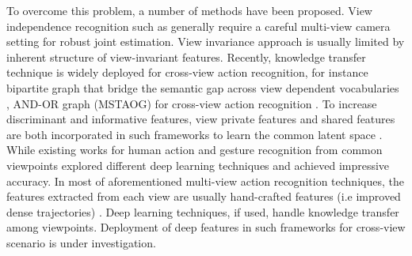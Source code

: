         To overcome this problem, a number of methods have been proposed. View independence recognition such as \cite{gavrila19963, lv2007single, weinland2007action} \cite{weinland2011survey} generally require a careful multi-view camera setting for robust joint estimation. View invariance approach \cite{junejo2008cross, li2012cross} is usually limited by inherent structure of view-invariant features. Recently, knowledge transfer technique is widely deployed for cross-view action recognition, for instance bipartite graph that bridge the semantic gap across view dependent vocabularies \cite{liu2011cross}, AND-OR graph (MSTAOG) for cross-view action recognition \cite{wang2014cross}. To increase discriminant and informative features, view private features and shared features are both incorporated in such frameworks to learn the common latent space \cite{kong2017deeply, liu2018hierarchically}. 
        While existing works for human action and gesture recognition from common viewpoints explored different deep learning techniques and achieved impressive accuracy. In most of aforementioned multi-view action recognition techniques, the features extracted from each view are usually hand-crafted features (i.e improved dense trajectories) \cite{rahmani2017learning, liu2018hierarchically,kong2017deeply}. Deep learning techniques, if used, handle knowledge transfer among viewpoints. Deployment of deep features in such frameworks for cross-view scenario is under investigation. 
